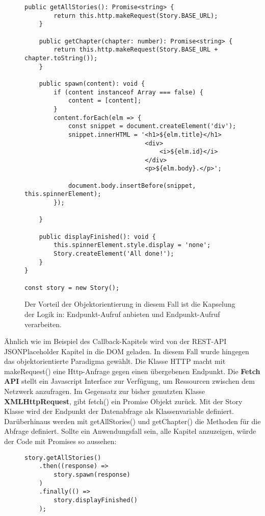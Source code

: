 \begin{figure}[H]
\begin{lstlisting}[basicstyle=\small]
    public getAllStories(): Promise<string> {
        return this.http.makeRequest(Story.BASE_URL);
    }

    public getChapter(chapter: number): Promise<string> {
        return this.http.makeRequest(Story.BASE_URL + chapter.toString());
    }
    
    public spawn(content): void {
        if (content instanceof Array === false) {
            content = [content];
        }
        content.forEach(elm => {
            const snippet = document.createElement('div');
            snippet.innerHTML = '<h1>${elm.title}</h1>
                                 <div>
                                     <i>${elm.id}</i>
                                 </div>
                                 <p>${elm.body}.</p>';

            document.body.insertBefore(snippet, this.spinnerElement);
        });

    }
    
    public displayFinished(): void {
        this.spinnerElement.style.display = 'none';
        Story.createElement('All done!');
    }
}

const story = new Story();
\end{lstlisting}
\caption{Der Vorteil der Objektorientierung in diesem Fall ist die Kapselung der Logik in: Endpunkt-Aufruf anbieten und Endpunkt-Aufruf verarbeiten.}
\end{figure}

\noindent
Ähnlich wie im Beispiel des Callback-Kapitels wird von der REST-API JSONPlaceholder Kapitel in die DOM geladen. In diesem Fall wurde hingegen das objektorientierte Paradigma gewählt. Die Klasse HTTP macht mit makeRequest() eine Http-Anfrage gegen einen übergebenen Endpunkt. Die \textbf{Fetch API} stellt ein Javascript Interface zur Verfügung, um Ressourcen zwischen dem Netzwerk anzufragen. Im Gegensatz zur bisher genutzten Klasse \textbf{XMLHttpRequest}, gibt fetch() ein Promise Objekt zurück. Mit der Story Klasse wird der Endpunkt der Datenabfrage als Klassenvariable definiert. Darüberhinaus werden mit getAllStories() und getChapter() die Methoden für die Abfrage definiert. Sollte ein Anwendungsfall sein, alle Kapitel anzuzeigen, würde der Code mit Promises so aussehen:

\begin{figure}[H]
\begin{lstlisting}[basicstyle=\small]
story.getAllStories()
    .then((response) =>
        story.spawn(response)
    )
    .finally(() =>
        story.displayFinished()
    );
\end{lstlisting}
\end{figure}

